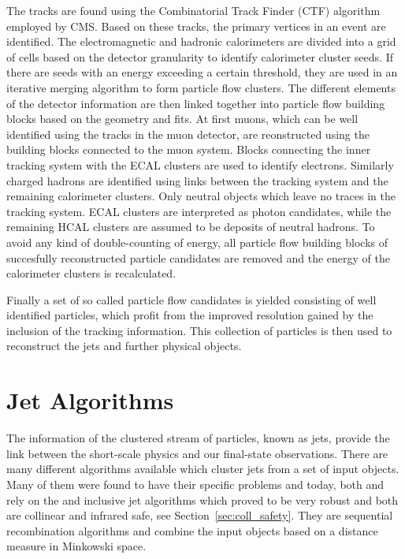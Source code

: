 The tracks are found using the Combinatorial Track Finder (CTF)
algorithm~\cite{Adam:2005cg} employed by CMS. Based on these tracks, the primary
vertices in an event are identified. The electromagnetic and hadronic
calorimeters are divided into a grid of cells based on the detector granularity
to identify calorimeter cluster seeds. If there are seeds with an energy
exceeding a certain threshold, they are used in an iterative merging algorithm
to form particle flow clusters. The different elements of the detector
information are then linked together into particle flow building blocks based on
the geometry and \chisq fits. At first muons, which can be well identified
using the tracks in the muon detector, are reonstructed using the building
blocks connected to the muon system. Blocks connecting the inner
tracking system with the ECAL clusters are used to identify electrons.
Similarly charged hadrons are identified using links between the
tracking system and the remaining calorimeter clusters. Only neutral objects
which leave no traces in the tracking system. ECAL clusters are
interpreted as photon candidates, while the remaining HCAL clusters are assumed
to be deposits of neutral hadrons. To avoid any kind of double-counting of
energy, all particle flow building blocks of succesfully reconstructed particle
candidates are removed and the energy of the calorimeter clusters is recalculated.

Finally a set of so called particle flow candidates is yielded consisting of
well identified particles, which profit from the improved resolution gained by
the inclusion of the tracking information. This collection of particles is then
used to reconstruct the jets and further physical objects.

\section{Jet Algorithms}
\label{sec:jet_algorithms}

The information of the clustered stream of particles, known as jets, provide the
link between the short-scale physics and our final-state observations. There
are many different algorithms available which cluster jets from a set of input
objects. Many of them were found to have their specific problems and today,
both \CMS and \ATLAS rely on the \antikt and inclusive \kt jet algorithms which proved to be very
robust and both are collinear and infrared safe, see Section~\ref{sec:coll_safety}.
They are sequential recombination algorithms and combine the input objects based on a
distance measure in Minkowski space.

